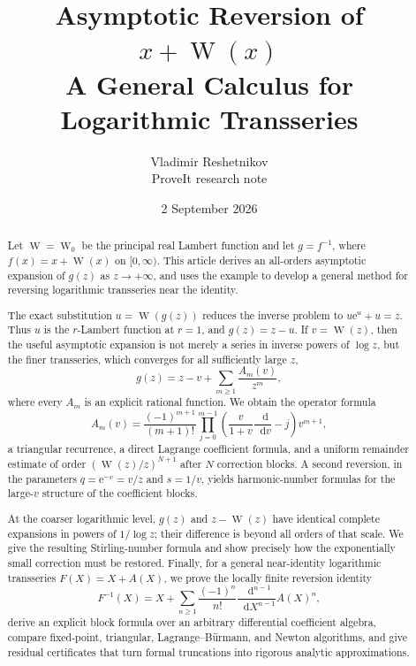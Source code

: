 \documentclass[11pt,oneside]{article}
\theoremstyle{plain}
\theoremstyle{definition}
\theoremstyle{remark}
\newcommand{\W}{\operatorname{W}}
\newcommand{\e}{\mathrm{e}}
\newcommand{\dd}{\mathop{}\!\mathrm{d}}
\begin{document}
\title{\textbf{Asymptotic Reversion of \(x+\W(x)\)}\\[0.35em]
  \Large A General Calculus for Logarithmic Transseries}
\author{Vladimir Reshetnikov\\
  \small ProveIt research note}
\date{2 September 2026}
\maketitle

\begin{abstract}
Let \(\W=\W_0\) be the principal real Lambert function and let
\(g=f^{-1}\), where \(f(x)=x+\W(x)\) on \([0,\infty)\).  This article derives
an all-orders asymptotic expansion of \(g(z)\) as \(z\to+\infty\), and uses the
example to develop a general method for reversing logarithmic transseries near
the identity.

The exact substitution \(u=\W(g(z))\) reduces the inverse problem to
\(u\e^u+u=z\).  Thus \(u\) is the \(r\)-Lambert function at \(r=1\), and
\(g(z)=z-u\).  If \(v=\W(z)\), then the useful asymptotic expansion is not
merely a series in inverse powers of \(\log z\), but the finer transseries,
which converges for all sufficiently large \(z\),
\[
 g(z)=z-v+\sum_{m\ge1}\frac{A_m(v)}{z^m},
\]
where every \(A_m\) is an explicit rational function.  We obtain the operator
formula
\[
 A_m(v)=\frac{(-1)^{m+1}}{(m+1)!}
 \prod_{j=0}^{m-1}\left(\frac{v}{1+v}\frac{\dd}{\dd v}-j\right)v^{m+1},
\]
a triangular recurrence, a direct Lagrange coefficient formula, and a
uniform remainder estimate of order \((\W(z)/z)^{N+1}\) after \(N\) correction
blocks.  A second reversion, in the parameters
\(q=\e^{-v}=v/z\) and \(s=1/v\), yields harmonic-number formulas for the
large-\(v\) structure of the coefficient blocks.

At the coarser logarithmic level, \(g(z)\) and \(z-\W(z)\) have identical
complete expansions in powers of \(1/\log z\); their difference is beyond all
orders of that scale.  We give the resulting Stirling-number formula and show
precisely how the exponentially small correction must be restored.  Finally,
for a general near-identity logarithmic transseries \(F(X)=X+A(X)\), we prove
the locally finite reversion identity
\[
 F^{-1}(X)=X+\sum_{n\ge1}\frac{(-1)^n}{n!}
 \frac{\dd^{n-1}}{\dd X^{n-1}}A(X)^n,
\]
derive an explicit block formula over an arbitrary differential coefficient
algebra, compare fixed-point, triangular, Lagrange--B\"urmann, and Newton
algorithms, and give residual certificates that turn formal truncations into
rigorous analytic approximations.
\end{abstract}
\end{document}
